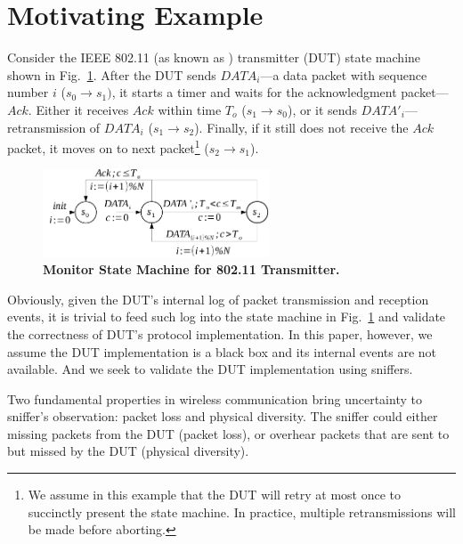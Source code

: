 \section{Motivating Example}
\label{sec:motivation}

Consider the IEEE 802.11 (as known as \wifi{}) transmitter (DUT) state machine
shown in Fig.~\ref{fig:dot11_tx_ta}. After the DUT sends $DATA_i$---a data
packet with sequence number $i$ ($s_0\rightarrow s_1)$, it starts a timer and
waits for the acknowledgment packet---$Ack$. Either it receives $Ack$ within time
$T_o$ ($s_1\rightarrow s_0$), or it sends $DATA'_i$---retransmission of $DATA_i$
($s_1\rightarrow s_2$). Finally, if it still does not receive the $Ack$ packet,
it moves on to next packet\footnote{We assume in this example that the DUT will
retry at most once to succinctly present the state machine.  In practice,
multiple retransmissions will be made before aborting.} ($s_2\rightarrow s_1$).

\begin{figure}
  \vspace*{-3mm}
  \centering
  \includegraphics[width=0.6\textwidth]{./figures/dot11_tx_ta.pdf}
  \caption{\textbf{Monitor State Machine for 802.11 Transmitter.}}
  \label{fig:dot11_tx_ta}
  \vspace*{-5mm}
\end{figure}

Obviously, given the DUT's internal log of packet transmission and reception
events, it is trivial to feed such log into the state machine in
Fig.~\ref{fig:dot11_tx_ta} and validate the correctness of DUT's protocol
implementation. In this paper, however, we assume the DUT implementation is a
black box and its internal events are not available. And we seek to validate the
DUT implementation using sniffers.

Two fundamental properties in wireless communication bring uncertainty
to sniffer's observation: packet loss and physical diversity. The sniffer could
either missing packets from the DUT (packet loss), or overhear packets that are
sent to but missed by the DUT (physical diversity).

